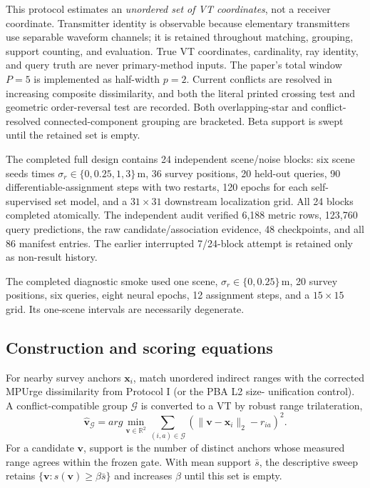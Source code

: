 \documentclass[10pt]{article}
\newcommand{\R}{\mathbb R}
\newcommand{\m}{\,\mathrm m}
\begin{document}
This protocol estimates an \emph{unordered set of VT coordinates}, not a
receiver coordinate.  Transmitter identity is observable because elementary
transmitters use separable waveform channels; it is retained throughout
matching, grouping, support counting, and evaluation.  True VT coordinates,
cardinality, ray identity, and query truth are never primary-method inputs.
The paper's total window $P=5$ is implemented as half-width $p=2$.  Current
conflicts are resolved in increasing composite dissimilarity, and both the
literal printed crossing test and geometric order-reversal test are recorded.
Both overlapping-star and conflict-resolved connected-component grouping are
bracketed.  Beta support is swept until the retained set is empty.

The completed full design contains 24 independent scene/noise blocks: six scene
seeds times $\sigma_r\in\{0,0.25,1,3\}\m$, 36 survey positions, 20 held-out
queries, 90 differentiable-assignment steps with two restarts, 120 epochs for
each self-supervised set model, and a $31\times31$ downstream localization
grid.  All 24 blocks completed atomically.  The independent audit verified
6,188 metric rows, 123,760 query predictions, the raw candidate/association
evidence, 48 checkpoints, and all 86 manifest entries.  The earlier interrupted
7/24-block attempt is retained only as non-result history.

The completed diagnostic smoke used one scene, $\sigma_r\in\{0,0.25\}\m$,
20 survey positions, six queries, eight neural epochs, 12 assignment steps,
and a $15\times15$ grid.  Its one-scene intervals are necessarily degenerate.

\subsection{Construction and scoring equations}

For nearby survey anchors $\mathbf x_i$, match unordered indirect ranges with
the corrected MPUrge dissimilarity from Protocol I (or the PBA L2 size-
unification control).  A conflict-compatible group $\mathcal G$ is converted
to a VT by robust range trilateration,
\begin{equation}
 \widehat{\mathbf v}_{\mathcal G}=arg\min_{\mathbf v\in\R^2}
 \sum_{(i,a)\in\mathcal G}
 \left(\|\mathbf v-\mathbf x_i\|_2-r_{ia}\right)^2.
\end{equation}
For a candidate $\mathbf v$, support is the number of distinct anchors whose
measured range agrees within the frozen gate.  With mean support $\bar s$, the
descriptive sweep retains $\{\mathbf v:s(\mathbf v)\ge\beta\bar s\}$ and
increases $\beta$ until this set is empty.
\end{document}
